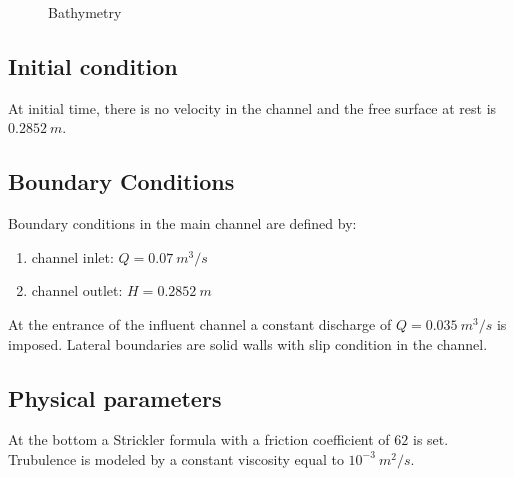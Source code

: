 \begin{figure}[H]
  \centering
  \caption{Bathymetry}\label{t2d:confluence:bathy}
\end{figure}

\subsection{Initial condition}

At initial time, there is no velocity in the channel and the free surface at rest is $0.2852~m$.

\subsection{Boundary Conditions}
%
Boundary conditions in the main channel are defined by:
\begin{enumerate}
\item[\textbullet] channel inlet: $Q = 0.07~m^3/s$
\item[\textbullet] channel outlet: $H = 0.2852~m$
\end{enumerate}

At the entrance of the influent channel a constant discharge of $Q = 0.035~m^3/s$ is imposed.
Lateral boundaries are solid walls with slip condition in the channel.

%
%
\subsection{Physical parameters}

At the bottom a Strickler formula with a friction coefficient of $62$ is set.
Trubulence is modeled by a constant viscosity equal to $10^{-3}~m^2/s$.

%
%
